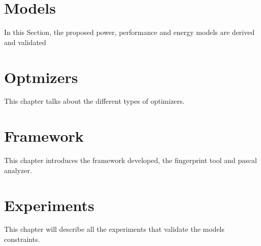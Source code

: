 \documentclass{report}
\begin{document}


%


\chapter{Models}
In this Section, the proposed power, performance and energy models are derived and validated



\chapter{Optmizers}
This chapter talks about the different types of optimizers.



\chapter{Framework}
This chapter introduces the framework developed, the fingerprint tool and pascal analyzer.



\chapter{Experiments}
This chapter will describe all the experiments that validate the models constraints.






\end{document}

